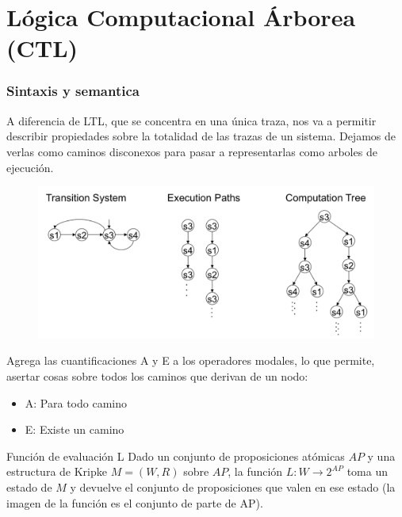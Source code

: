 \part{Lógica Computacional Árborea (CTL)}
\section{Sintaxis y semantica}
A diferencia de LTL, que se concentra en una única traza, nos va a permitir describir propiedades sobre la totalidad de las trazas de un sistema. Dejamos de verlas como caminos disconexos para pasar a representarlas como arboles de ejecución.

\begin{figure}[h]
\centering
	\includegraphics[scale=0.25]{imagenes/ctl-ltl-comparison}
\end{figure}

Agrega las cuantificaciones A y E a los operadores modales, lo que permite, asertar cosas sobre todos los caminos que derivan de un nodo:
\begin{itemize}
\item A: Para todo camino
\item E: Existe un camino
\end{itemize}

\begin{definicion}{Función de evaluación L}
Dado un conjunto de proposiciones atómicas $AP$ y una estructura de Kripke $M=(W,R)$ sobre $AP$, la función $L:W\to 2^{AP}$ toma un estado de $M$ y devuelve el conjunto de proposiciones que valen en ese estado (la imagen de la función es el conjunto de parte de AP).
\end{definicion}
